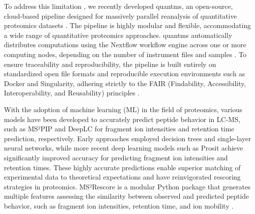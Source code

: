 \documentclass[12pt]{article}
\begin{document}
To address this limitation %
, we recently developed quantms, an open-source, cloud-based pipeline designed for massively parallel reanalysis of quantitative proteomics datasets \cite{dai_quantms_2024}. The pipeline is highly modular and flexible, accommodating a wide range of quantitative proteomics approaches. quantms automatically distributes computations using the Nextflow workflow engine across one or more computing nodes, depending on the number of instrument files and samples \cite{di_tommaso_nextflow_2017}. To ensure traceability and reproducibility, the pipeline is built entirely on standardized open file formats \cite{dai_proteomics_2021} \cite{martens_mzmlcommunity_2011} and reproducible execution environments such as Docker and Singularity, adhering strictly to the FAIR (Findability, Accessibility, Interoperability, and Reusability) principles \cite{wilkinson_fair_2016}. %

With the adoption of machine learning (ML) in the field of proteomics, various models have been developed to accurately predict peptide behavior in LC-MS, such as MS²PIP \cite{degroeve_ms2pip_2013} and DeepLC \cite{bouwmeester_deeplc_2021} for fragment ion intensities and retention time prediction, respectively. %
Early approaches employed decision trees and single-layer neural networks, while more recent deep learning models such as Prosit \cite{gessulat_prosit_2019} achieve significantly improved accuracy for predicting fragment ion intensities and retention times. These highly accurate predictions enable superior matching of experimental data to theoretical expectations and have reinvigorated rescoring strategies in proteomics. %
MS²Rescore is a modular Python package that generates multiple features assessing the similarity between observed and predicted peptide behavior, such as fragment ion intensities, retention time, and ion mobility \cite{buur_ms2_2024}. %
\end{document}
